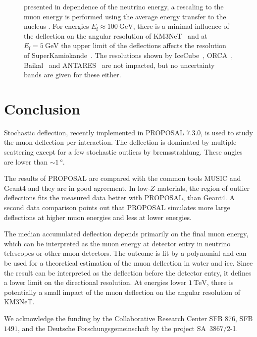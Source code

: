 \begin{figure}
{    presented in dependence of the neutrino energy, a rescaling to the muon energy is performed 
    using the average energy transfer to the nucleus \cite{GANDHI199681}. 
    For energies 
    $E_{\text{f}} \approx \SI{100}{\giga\electronvolt}$, there is a minimal influence of the deflection on the angular resolution of 
    KM3NeT~\cite{KM3NeT_Resolution2021} and at $E_{\mathrm{f}} = \SI{5}{\giga\electronvolt}$ the upper limit of the deflections affects the resolution 
    of SuperKamiokande~\cite{SuperKamiokande_Resolution2008}. The resolutions shown by IceCube~\cite{IceCube_Resolution2021}, ORCA~\cite{ORCA_Resolution2021}, 
    Baikal~\cite{Baikal_Resolution2021} and ANTARES~\cite{ANTARES_Resolution2019} are not impacted, but no uncertainty bands are given for these either.}
    \label{fig:fit_median}
\end{figure}

\section{Conclusion}\label{sec:conclusion}

Stochastic deflection, recently implemented in PROPOSAL 7.3.0, is 
used to study the muon deflection per interaction. The deflection 
is dominated by multiple scattering except for a few stochastic 
outliers by bremsstrahlung. These angles are lower than
$\sim\SI{1}{\degree}$. 

The results of PROPOSAL are compared with the common tools MUSIC and 
Geant4 and they are in good agreement. In low-$Z$ materials, the region of outlier 
deflections fits the measured data better with PROPOSAL, than Geant4. 
A second data comparison points out that PROPOSAL simulates more 
large deflections at higher muon energies and less at lower 
energies.

The median accumulated deflection depends primarily on the final muon energy, which can be interpreted as the muon energy at detector entry 
in neutrino telescopes or other muon detectors.
The outcome is fit by a polynomial and can be used for 
a theoretical estimation of the muon deflection in water and ice.
Since the result can be interpreted as the deflection before the detector entry, it defines a lower limit on the directional resolution.
At energies lower $\SI{1}{\tera\electronvolt}$, there is potentially a small impact of the muon deflection on the angular 
resolution of KM3NeT.


\begin{acknowledgement}
  We acknowledge the funding by the Collaborative Research Center SFB $876$, SFB $1491$, 
  and the Deutsche Forschungsgemeinschaft by the project SA~$3867/$2-1.
\end{acknowledgement}


\printbibliography




